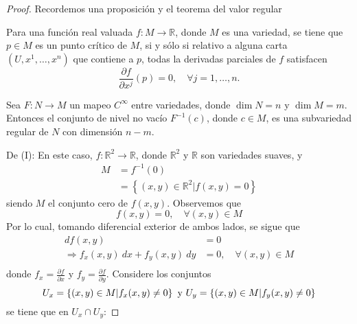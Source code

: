 \documentclass[12pt]{report}
\theoremstyle{largebreak}
\newcommand\cf[3]{\ensuremath{#1:#2\rightarrow#3}}
\begin{document}
    \begin{proof}
        Recordemos una proposición y el teorema del valor regular

        \setcounter{section}{8}
        \setcounter{propo}{22}

        \begin{propo}
            Para una función real valuada $\cf{f}{M}{\mathbb{R}}$, donde $M$ es una variedad, se tiene que $p\in M$ es un punto crítico de $M$, si y sólo si relativo a alguna carta $(U,x^1,\dots,x^n)$ que contiene a $p$, todas la derivadas parciales de $f$ satisfacen
            \begin{equation*}
                \frac{\partial f}{\partial x^j}(p)=0,\quad\forall j=1,\dots,n.
            \end{equation*}
        \end{propo}

        \setcounter{section}{9}
        \setcounter{theor}{8}

        \begin{theor}
            Sea $\cf{F}{N}{M}$ un mapeo $C^\infty$ entre variedades, donde $\dim N = n$ y $\dim M = m$. Entonces el conjunto de nivel no vacío $F^{-1}(c)$, donde $c\in M$, es una subvariedad regular de $N$ con dimensión $n-m$.
        \end{theor}

        De (I): En este caso, $\cf{f}{\mathbb{R}^2}{\mathbb{R}}$, donde $\mathbb{R}^2$ y $\mathbb{R}$ son variedades suaves, y
        \begin{equation*}
            \begin{split}
                M&=f^{-1}(0)\\
                &=\left\{(x,y)\in\mathbb{R}^2|f(x,y)=0\right\}
            \end{split}
        \end{equation*}
        siendo $M$ el conjunto cero de $f(x,y)$. Observemos que
        \begin{equation*}
            f(x,y)=0,\quad\forall (x,y)\in M
        \end{equation*}
        Por lo cual, tomando diferencial exterior de ambos lados, se sigue que
        \begin{equation*}
            \begin{split}
                df(x,y)&=0\\
                \Rightarrow f_x(x,y)\:dx+f_y(x,y)\:dy&=0,\quad\forall (x,y)\in M\\
            \end{split}
        \end{equation*}
        donde $f_x=\frac{\partial f}{\partial x}$ y $f_y=\frac{\partial f}{\partial y}$. Considere los conjuntos
        \begin{equation*}
            U_x=\left\{(x,y)\in M|f_x(x,y)\neq 0\right\}\textup{ y }U_y=\left\{(x,y)\in M|f_y(x,y)\neq 0\right\}
        \end{equation*}
        se tiene que en $U_x\cap U_y$:


\end{proof}
\end{document}
